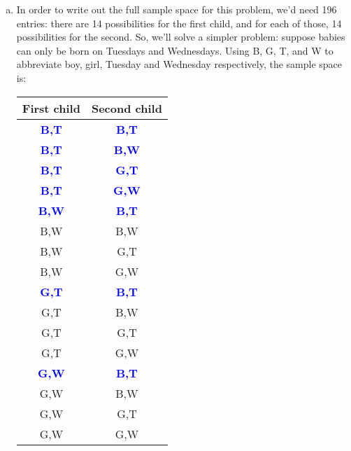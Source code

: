 \documentclass[12pt]{article}
\newcommand{\cond}[1]{\textbf{\textcolor{blue}{#1}}}
\begin{document}
{\begin{enumerate}[(a)]
            Here, our conditioning event, ``at least one child is a boy,'' only
            eliminates one possibility, leaving 3 equally likely candidates.
            Once again, only the first out of the three satisfies the event
            we're looking for. So, the probability is $\frac{1}{3}$.
        \item In order to write out the full sample space for this problem,
            we'd need 196 entries: there are 14 possibilities for the first child,
            and for each of those, 14 possibilities for the second.  So, we'll
            solve a simpler problem: suppose babies can only be born on Tuesdays
            and Wednesdays.  Using B, G, T, and W to abbreviate boy, girl, Tuesday
            and Wednesday respectively, the sample space is:
            \begin{table}[h!]
                \centering
                \begin{tabular}{|c|c|}
                    \hline
                    First child & Second child \\ \hline
                    \cond{B,T} & \cond{B,T} \\
                    \cond{B,T} & \cond{B,W} \\
                    \cond{B,T} & \cond{G,T} \\
                    \cond{B,T} & \cond{G,W} \\
                    \hline
                    \cond{B,W} & \cond{B,T} \\
                    B,W & B,W \\
                    B,W & G,T \\
                    B,W & G,W \\
                    \hline
                    \cond{G,T} & \cond{B,T} \\
                    G,T & B,W \\
                    G,T & G,T \\
                    G,T & G,W \\
                    \hline
                    \cond{G,W} & \cond{B,T} \\
                    G,W & B,W \\
                    G,W & G,T \\
                    G,W & G,W \\
                    \hline
                \end{tabular}
            \end{table}


\end{enumerate}}
\end{document}
